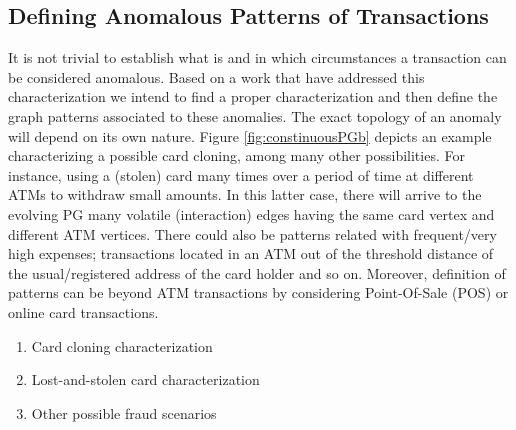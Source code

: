 \subsection{Defining Anomalous Patterns of Transactions}\label{sub:anomalouspatterns}
It is not trivial to establish what is and in which circumstances a transaction can be considered anomalous. Based on a work that have addressed this characterization \cite{magdalena2021artificial} we intend to find a proper characterization and then define the graph patterns associated to these anomalies. The exact topology of an anomaly will depend on its own nature. Figure \ref{fig:constinuousPGb} depicts an example characterizing a possible card cloning, among many other possibilities. For instance, using a (stolen) card many times over a period of time at different ATMs to withdraw small amounts. In this latter case, there will arrive to the evolving PG many volatile (interaction) edges having the same card vertex and different ATM vertices. There could also be patterns related with frequent/very high expenses; transactions  located in an ATM out of the threshold distance of the usual/registered address of the card holder and so on.
Moreover, definition of patterns can be beyond ATM transactions by considering Point-Of-Sale (POS) or online card transactions.
%
\iffalse
\subsubsection*{Fraud Patterns Definition}

It is not trivial to establish what is and in which circumstances an ATM transaction can be considered anomalous. Based on a work that have addressed this characterization \cite{FP-magdalena2021artificial} we intend to find a proper characterization and then define the graph patterns associated to these anomalies. The exact topology of an anomaly will depend on its own nature. Moreover, definition of patterns can be beyond ATM transactions by considering online card transactions. In what follows, we propose a characterization of some possible anomalous patterns of ATM transactions and the definition of their associated PG graph patterns. 
\fi
%
\begin{enumerate}
\renewcommand{\labelenumi}{\Roman{enumi}.} %
    \item Card cloning characterization
    \item Lost-and-stolen card characterization
    \item Other possible fraud scenarios
\end{enumerate}


